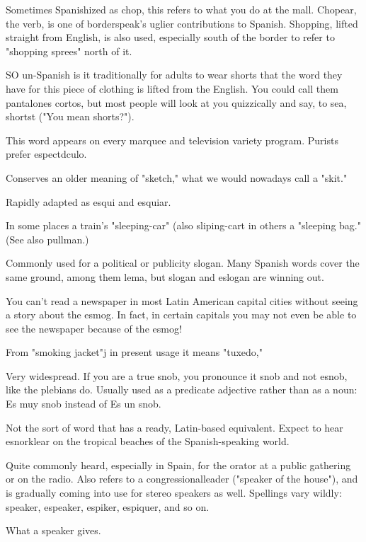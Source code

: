  Sometimes Spanishized as chop, this refers to what
you do at the mall. Chopear, the verb, is one of borderspeak's uglier
contributions to Spanish. Shopping, lifted straight from English, is also
used, especially south of the border to refer to "shopping sprees" north
of it.

 SO un-Spanish is it traditionally for adults to wear
shorts that the word they have for this piece of clothing is lifted
from the English. You could call them pantalones cortos, but most
people will look at you quizzically and say, to sea, shortst ("You mean
shorts?").

 This word appears on every marquee and television
variety program. Purists prefer espectdculo.

 Conserves an older meaning of "sketch," what we
would nowadays call a "skit."

 Rapidly adapted as esqui and esquiar.

 In some places a train's "sleeping-car" (also
sliping-cart in others a "sleeping bag." (See also pullman.)

 Commonly used for a political or publicity slogan.
Many Spanish words cover the same ground, among them lema, but
slogan and eslogan are winning out.

 You can't read a newspaper in most Latin American
capital cities without seeing a story about the esmog. In fact, in certain capitals you may not even be able to see the newspaper because
of the esmog!

 From "smoking jacket"j in present usage it means
"tuxedo,"

 Very widespread. If you are a true snob, you pronounce
it snob and not esnob, like the plebians do. Usually used as a predicate
adjective rather than as a noun: Es muy snob instead of Es un snob.

 Not the sort of word that has a ready, Latin-based
equivalent. Expect to hear esnorklear on the tropical beaches of the
Spanish-speaking world.

 Quite commonly heard, especially in Spain, for
the orator at a public gathering or on the radio. Also refers to a congressionalleader ("speaker of the house"), and is gradually coming
into use for stereo speakers as well. Spellings vary wildly: speaker,
espeaker, espiker, espiquer, and so on.

 What a speaker gives.

